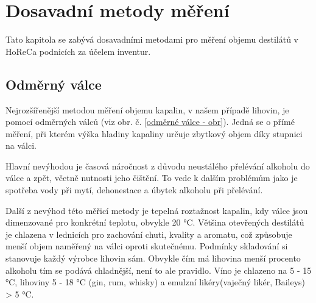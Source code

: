 \chapter{Dosavadní metody měření}
\label{Dosavadní metody měření}
Tato kapitola se zabývá dosavadními metodami pro měření objemu destilátů v HoReCa podnicích za účelem inventur.

\section{Odměrný válce}
\label{Dosavadní metody měření - valce}



Nejrozšířenější metodou měření objemu kapalin, v našem případě lihovin, je pomocí odměrných válců (viz obr. č. \ref{odměrné válce - obr}). Jedná se o přímé měření, při kterém výška hladiny kapaliny určuje zbytkový objem díky stupnici na válci.

Hlavní nevýhodou je časová náročnost z důvodu neustálého přelévání alkoholu do válce a zpět, včetně nutnosti 
jeho čištění. To vede k dalším problémům jako je spotřeba vody při mytí, dehonestace a úbytek alkoholu při přelévání.

Další z nevýhod této měřicí metody je tepelná roztažnost kapalin, kdy válce jsou dimenzované pro 
konkrétní teplotu, obvykle 20 °C. Většina otevřených destilátů je chlazena v lednicích pro zachování chuti, kvality a aromatu, což způsobuje menší objem naměřený na válci oproti skutečnému. Podmínky skladování si stanovuje každý výrobce lihovin sám. Obvykle čím má lihovina menší procento alkoholu tím se podává chladnější, není to ale pravidlo. Víno je chlazeno na 5 - 15 °C, lihoviny 5 - 18 °C (gin, rum, whisky) a emulzní likéry(vaječný likér, Baileys) > 5 °C. 
	
